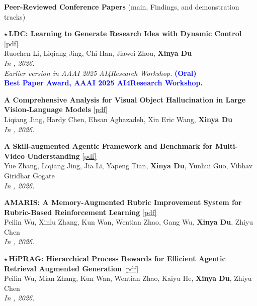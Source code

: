 \vspace{1.5mm}
\noindent \textbf{Peer-Reviewed Conference Papers} {\small (main, Findings, and demonstration tracks)}
\begin{enumerate}[{[}1{]},resume,leftmargin=*]

\parbox{\linewidth}{
\item\label{pub:ldc}
$\star$\,{\bf LDC: Learning to Generate Research Idea with Dynamic Control}
\href{https://arxiv.org/abs/2412.14626}{{{[pdf]}}} \\
Ruochen Li, Liqiang Jing, Chi Han, Jiawei Zhou, \textbf{Xinya Du} \\
{\it In \EMNLP, 2026.} \\
{\it Earlier version in AAAI 2025 AI4Research Workshop.} {\textcolor{blue}{\textbf{(Oral)}}} \\
{\textcolor{blue}{\textbf{Best Paper Award, AAAI 2025 AI4Research Workshop.}}} \\
}

\parbox{\linewidth}{
\item
{\bf A Comprehensive Analysis for Visual Object Hallucination in Large Vision-Language Models}
\href{https://arxiv.org/abs/2505.01958}{{{[pdf]}}} \\
Liqiang Jing, Hardy Chen, Ehsan Aghazadeh, Xin Eric Wang, \textbf{Xinya Du} \\
{\it In \EMNLPfinding, 2026.} \\
}

\parbox{\linewidth}{
\item
{\bf A Skill-augmented Agentic Framework and Benchmark for Multi-Video Understanding}
\href{https://arxiv.org/abs/2603.14733}{{{[pdf]}}} \\
Yue Zhang, Liqiang Jing, Jia Li, Yapeng Tian, \textbf{Xinya Du}, Yunhui Guo, Vibhav Giridhar Gogate \\
{\it In \EMNLPfinding, 2026.} \\
}

\parbox{\linewidth}{
\item
{\bf AMARIS: A Memory-Augmented Rubric Improvement System for Rubric-Based Reinforcement Learning}
\href{https://arxiv.org/abs/2605.18592}{{{[pdf]}}} \\
Peilin Wu, Xinlu Zhang, Kun Wan, Wentian Zhao, Gang Wu, \textbf{Xinya Du}, Zhiyu Chen \\
{\it In \EMNLPfinding, 2026.} \\
}

\parbox{\linewidth}{
\item\label{pub:hiprag}
$\star$\,{\bf HiPRAG: Hierarchical Process Rewards for Efficient Agentic Retrieval Augmented Generation}
\href{https://arxiv.org/pdf/2510.07794}{{{[pdf]}}} \\
Peilin Wu, Mian Zhang, Kun Wan, Wentian Zhao, Kaiyu He, \textbf{Xinya Du}, Zhiyu Chen \\
{\it In \ICLR, 2026.} \\
}


\end{enumerate}
